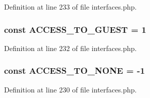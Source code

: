 Definition at line 233 of file interfaces.php.

\hypertarget{group__constants__acl__indices_gaaef8a39bfe4d39dca0f45fdb837a8d59}{
\subsubsection[{ACCESS\_\-TO\_\-GUEST}]{\setlength{\rightskip}{0pt plus 5cm}const ACCESS\_\-TO\_\-GUEST = 1}}
\label{group__constants__acl__indices_gaaef8a39bfe4d39dca0f45fdb837a8d59}


Definition at line 232 of file interfaces.php.

\hypertarget{group__constants__acl__indices_ga63d56389fe1e58d0b097471ca4f4dc00}{
\subsubsection[{ACCESS\_\-TO\_\-NONE}]{\setlength{\rightskip}{0pt plus 5cm}const ACCESS\_\-TO\_\-NONE = -\/1}}
\label{group__constants__acl__indices_ga63d56389fe1e58d0b097471ca4f4dc00}


Definition at line 230 of file interfaces.php.

